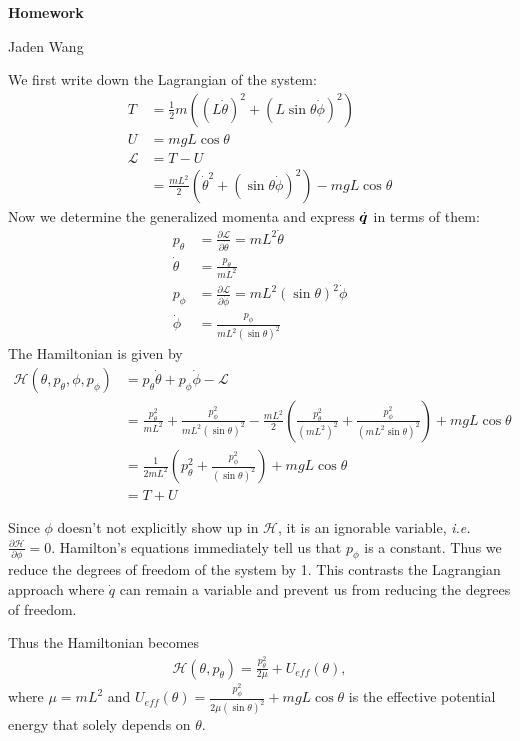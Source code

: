\documentclass[12pt]{article}
\begin{document}
\centerline {\textsf{\textbf{\LARGE{Homework }}}}
\centerline {Jaden Wang}
\vspace{.15in}

We first write down the Lagrangian of the system:
\begin{align*}
	T &= \frac{1}{2}m \left( \left( L \dot{\theta} \right)^2 + \left( L\sin \theta \dot{\phi} \right)^2   \right)  \\
	U &= mg L \cos \theta \\
	\mathcal{L} &= T - U \\
	&= \frac{mL^2}{2} \left( \dot{\theta}^2 + \left( \sin \theta \dot{\phi} \right)^2   \right)  - mg L \cos \theta
\end{align*}
Now we determine the generalized momenta and express $ \dot{ {\bm{ q}} }$ in terms of them:
\begin{align*}
	p_{\theta} &= \frac{\partial \mathcal{ L}}{\partial \dot{\theta}} = mL^2 \dot{\theta}\\
	\dot{\theta} &= \frac{p_{\theta}}{ mL^2}\\
	p_{\phi} &= \frac{\partial \mathcal{ L}}{\partial \dot{\phi}} = mL^2 (\sin \theta)^2 \dot{\phi} \\
	\dot{\phi} &= \frac{p_{\phi}}{ mL^2 (\sin \theta)^2} 
\end{align*}
The Hamiltonian is given by
\begin{align*}
	\mathcal{ H}(\theta,p_{\theta},\phi,p_{\phi}) &= p_{\theta} \dot{\theta} + p_{\phi} \dot{\phi} - \mathcal{ L} \\
	&= \frac{p_{\theta}^2}{ mL^2} + \frac{p_{\phi}^2}{ mL^2 (\sin \theta)^2} - \frac{mL^2}{ 2} \left( \frac{p_{\theta}^2}{ (mL^2)^2} + \frac{p_{\phi}^2}{ (mL^2 \sin \theta)^2 } \right) + mgL \cos \theta\\
	&= \frac{1}{2mL^2} \left( p_{\theta}^2 + \frac{p_{\phi}^2}{(\sin \theta)^2 } \right) + mgL \cos \theta \\
	&= T+U 
\end{align*}

Since $ \phi$ doesn't not explicitly show up in $ \mathcal{ H}$, it is an ignorable variable, \emph{i.e.}  $ \frac{\partial \mathcal{ H}}{\partial \phi} =0$. Hamilton's equations immediately tell us that $ p_{\phi}$ is a constant. Thus we reduce the degrees of freedom of the system by 1. This contrasts the Lagrangian approach where $ \dot{q}$ can remain a variable and prevent us from reducing the degrees of freedom.

Thus the Hamiltonian becomes
\begin{align*}
	\mathcal{ H}(\theta, p_{\theta}) = \frac{p_{\theta}^2}{ 2 \mu} + U_{eff}(\theta),
\end{align*}
where $ \mu = mL^2$ and $ U_{eff}(\theta) = \frac{p_{\phi}^2}{2\mu (\sin\theta)^2 } + mgL\cos \theta$ is the effective potential energy that solely depends on $ \theta$.
\end{document}
